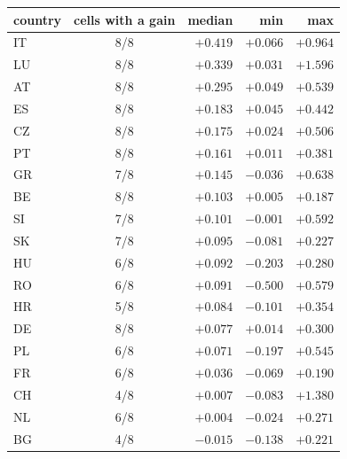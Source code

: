 \begin{tabular}{lcrrr}
\toprule
country & cells with a gain & median & min & max \\
\midrule
IT & 8/8 & $+0.419$ & $+0.066$ & $+0.964$ \\
LU & 8/8 & $+0.339$ & $+0.031$ & $+1.596$ \\
AT & 8/8 & $+0.295$ & $+0.049$ & $+0.539$ \\
ES & 8/8 & $+0.183$ & $+0.045$ & $+0.442$ \\
CZ & 8/8 & $+0.175$ & $+0.024$ & $+0.506$ \\
PT & 8/8 & $+0.161$ & $+0.011$ & $+0.381$ \\
GR & 7/8 & $+0.145$ & $-0.036$ & $+0.638$ \\
BE & 8/8 & $+0.103$ & $+0.005$ & $+0.187$ \\
SI & 7/8 & $+0.101$ & $-0.001$ & $+0.592$ \\
SK & 7/8 & $+0.095$ & $-0.081$ & $+0.227$ \\
HU & 6/8 & $+0.092$ & $-0.203$ & $+0.280$ \\
RO & 6/8 & $+0.091$ & $-0.500$ & $+0.579$ \\
HR & 5/8 & $+0.084$ & $-0.101$ & $+0.354$ \\
DE & 8/8 & $+0.077$ & $+0.014$ & $+0.300$ \\
PL & 6/8 & $+0.071$ & $-0.197$ & $+0.545$ \\
FR & 6/8 & $+0.036$ & $-0.069$ & $+0.190$ \\
CH & 4/8 & $+0.007$ & $-0.083$ & $+1.380$ \\
NL & 6/8 & $+0.004$ & $-0.024$ & $+0.271$ \\
BG & 4/8 & $-0.015$ & $-0.138$ & $+0.221$ \\
\bottomrule
\end{tabular}
